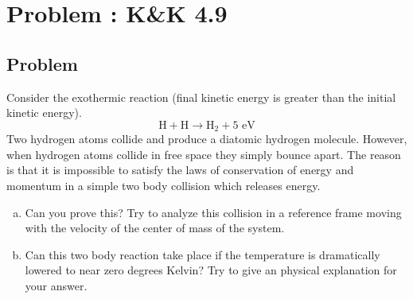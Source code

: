 \documentclass[solutions]{esg8012pset}
\begin{document}
\begin{enumerate}[a)]
\end{enumerate}
\section{Problem \thesection: K\&K 4.9}
\subsection{Problem}
  Consider the exothermic reaction (final kinetic energy is greater than the initial kinetic energy).
  $$\text{H} + \text{H} \to \text{H}_2 + 5\text{ eV}$$
  Two hydrogen atoms collide and produce a diatomic hydrogen molecule. However, when hydrogen atoms collide in free space they simply bounce apart. The reason is that it is impossible to satisfy the laws of conservation of energy and momentum in a simple two body collision which releases energy.
  \begin{enumerate}[(a)]
  \item Can you prove this? Try to analyze this collision in a reference frame moving with the velocity of the center of mass of the system.
    \item Can this two body reaction take place if the temperature is dramatically lowered to near zero degrees Kelvin? Try to give an physical explanation for your answer.
  \end{enumerate}
\end{document}
